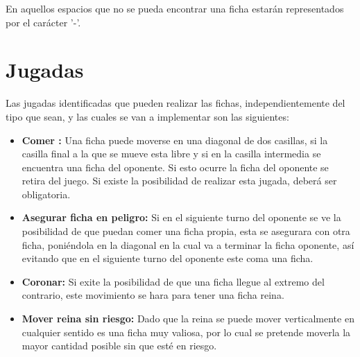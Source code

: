 \documentclass[12pt]{article}
\begin{document}
    En aquellos espacios que no se pueda encontrar una ficha estarán representados por el carácter '-'.
    
\section{Jugadas}

    Las jugadas identificadas que pueden realizar las fichas, independientemente del tipo que sean, y las cuales se van a implementar son las siguientes:

    \begin{itemize}
        \item\textbf{Comer :}
            Una ficha puede moverse en una diagonal de dos casillas, si la casilla final a la que se mueve esta libre y si en la casilla intermedia se encuentra una ficha del oponente. Si esto ocurre la ficha del oponente se retira del juego. Si existe la posibilidad de realizar esta jugada, deberá ser obligatoria.
        
        \item\textbf{Asegurar ficha en peligro:} 
            Si en el siguiente turno del oponente se ve la posibilidad de que puedan comer una ficha propia, esta se asegurara con otra ficha, poniéndola en la diagonal en la cual va a terminar la ficha oponente, así evitando que en el siguiente turno del oponente este coma una ficha.
        
        \item\textbf{Coronar:}
            Si exite la posibilidad de que una ficha llegue al extremo del contrario, este movimiento se hara para tener una ficha reina.
        
        \item\textbf{Mover reina sin riesgo:}
            Dado que la reina se puede mover verticalmente en cualquier sentido es una ficha muy valiosa, por lo cual se pretende moverla la mayor cantidad posible sin que esté en riesgo.
    \end{itemize}
    
\end{document}
